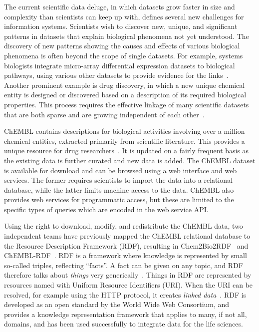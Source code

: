 \documentclass[10pt]{bmc_article}
\newenvironment{bmcformat}{\begin{raggedright}\baselineskip20pt\sloppy\setboolean{publ}{false}}{\end{raggedright}\baselineskip20pt\sloppy}
\begin{document}
\begin{bmcformat}
The current scientific data deluge, in which datasets grow faster in size and complexity than scientists can keep up with,
defines several new challenges for information systems. Scientists wish to 
discover new, unique, and significant patterns in datasets that explain biological 
phenomena not yet understood. The discovery of new patterns showing the 
causes and effects of various biological phenomena is often beyond the scope of single datasets.
For example, systems biologists integrate micro-array differential expression datasets to 
biological pathways, using various other datasets to provide evidence for the links~\cite{Staab2007}. 
Another prominent example is drug discovery, in which a new unique chemical entity is designed or discovered 
based on a description of its required biological properties. This process requires the effective 
linkage of many scientific datasets that are both sparse and are growing independent of each
other~\cite{Belleau2008,Samwald2011,Williams2012}.

ChEMBL contains descriptions for biological activities involving over a million chemical 
entities, extracted primarily from scientific literature. This provides a unique resource for drug researchers~\cite{Gaulton2012,Warr2009}.
It is updated on a fairly frequent basis as the existing data is further curated and new data is added. 
The ChEMBL dataset is available for download and can be browsed using a web interface and web services.
The former requires scientists to import the data into a relational database, while the 
latter limits machine access to the data. ChEMBL also provides web services for programmatic
access, but these are limited to the specific types of queries which are encoded in the web service API. 

Using the right to download, modify, and redistribute the ChEMBL data, two independent teams
have previously mapped the ChEMBL relational database to the Resource Description Framework (RDF), resulting
in Chem2Bio2RDF~\cite{Chen2010} and ChEMBL-RDF~\cite{Willighagen2011}. RDF is a framework where
knowledge is represented by small so-called triples, reflecting ``facts''. A fact can
be given on any topic, and RDF therefore talks about \textit{things} very generically~\cite{Miller:04:RP}. Things in RDF
are represented by resources named with Uniform Resource Identifiers (URI). When the URI can be resolved, 
for example using the HTTP protocol, it creates \emph{linked data}~\cite{Bizer2008}. RDF is
developed as an open standard by the World Wide Web Consortium, and provides a knowledge
representation framework that applies to many, if not all, domains, and has been used successfully 
to integrate data for the life sciences.


\end{bmcformat}
\end{document}
